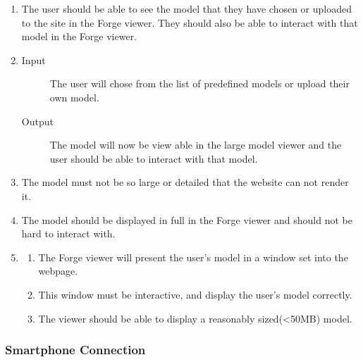 \documentclass[letterpaper, 10pt, draftclsnofoot, compsoc, onecolumn]{IEEEtran}
\begin{document}
\begin{enumerate}
	\item	The user should be able to see the model that they have chosen or uploaded to the site in the Forge viewer. They 
	should also be able to interact with that model in the Forge viewer. 

	\item
	\begin{description}
		\item[Input] The user will chose from the list of predefined models or upload their own model. 
		\item[Output] The model will now be view able in the large model viewer and the user should be able to interact with that model.
	\end{description}

	\item The model must not be so large or detailed that the website can not render it.


	\item The model should be displayed in full in the Forge viewer and should not be hard to interact with. 

	\item 
	\begin{enumerate}
		\item The Forge viewer will present the user's model in a window set into the webpage. 
		\item This window must be interactive, and display the user's model correctly. 
		\item The viewer should be able to display a reasonably sized(<50MB) model. 
	\end{enumerate}
\end{enumerate}

\subsubsection{Smartphone Connection}
\end{document}
